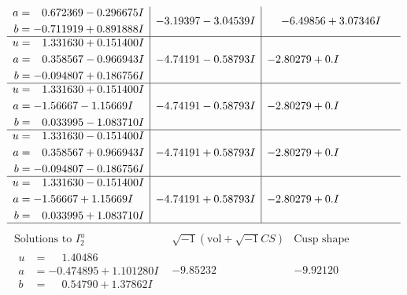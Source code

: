 \documentclass[1p]{elsarticle_modified}
\theoremstyle{definition}
\newcommand{\I}{\sqrt{-1}}
\begin{document}
$$\begin{array}{c|c|c}
\begin{aligned}
a &= \phantom{-}0.672369 - 0.296675 I \\
b &= -0.711919 + 0.891888 I\end{aligned}
 & -3.19397 - 3.04539 I & -6.49856 + 3.07346 I \\ \hline\begin{aligned}
u &= \phantom{-}1.331630 + 0.151400 I \\
a &= \phantom{-}0.358567 - 0.966943 I \\
b &= -0.094807 + 0.186756 I\end{aligned}
 & -4.74191 - 0.58793 I & -2.80279 + 0. I\phantom{ +0.000000I} \\ \hline\begin{aligned}
u &= \phantom{-}1.331630 + 0.151400 I \\
a &= -1.56667 - 1.15669 I \\
b &= \phantom{-}0.033995 - 1.083710 I\end{aligned}
 & -4.74191 - 0.58793 I & -2.80279 + 0. I\phantom{ +0.000000I} \\ \hline\begin{aligned}
u &= \phantom{-}1.331630 - 0.151400 I \\
a &= \phantom{-}0.358567 + 0.966943 I \\
b &= -0.094807 - 0.186756 I\end{aligned}
 & -4.74191 + 0.58793 I & -2.80279 + 0. I\phantom{ +0.000000I} \\ \hline\begin{aligned}
u &= \phantom{-}1.331630 - 0.151400 I \\
a &= -1.56667 + 1.15669 I \\
b &= \phantom{-}0.033995 + 1.083710 I\end{aligned}
 & -4.74191 + 0.58793 I & -2.80279 + 0. I\phantom{ +0.000000I}\\
 \hline 
 \end{array}$$\newpage$$\begin{array}{c|c|c}  
\text{Solutions to }I^u_{2}& \I (\text{vol} + \sqrt{-1}CS) & \text{Cusp shape}\\
 \hline 
\begin{aligned}
u &= \phantom{-}1.40486\phantom{ +0.000000I} \\
a &= -0.474895 + 1.101280 I \\
b &= \phantom{-}0.54790 + 1.37862 I\end{aligned}
 & -9.85232\phantom{ +0.000000I} & -9.92120\phantom{ +0.000000I} \\ \hline\begin{aligned}

\end{aligned}
\end{array}$$
\end{document}
